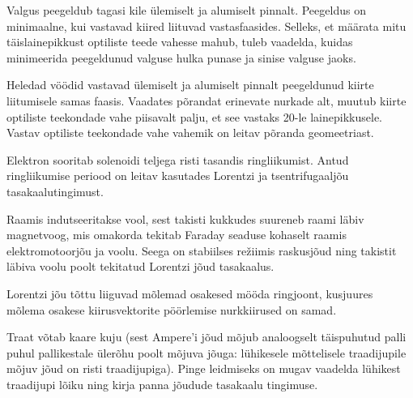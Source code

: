 \documentclass[10pt, twoside]{article}
\begin{document}
{%

\hint
Valgus peegeldub tagasi kile ülemiselt ja alumiselt pinnalt. Peegeldus on minimaalne, kui vastavad kiired liituvad vastasfaasides. Selleks, et määrata mitu täislainepikkust optiliste teede vahesse mahub, tuleb vaadelda, kuidas minimeerida peegeldunud valguse hulka punase ja sinise valguse jaoks.
\probend
\bigskip


\hint
Heledad vöödid vastavad ülemiselt ja alumiselt pinnalt peegeldunud kiirte liitumisele samas faasis. Vaadates põrandat erinevate nurkade alt, muutub kiirte optiliste teekondade vahe piisavalt palju, et see vastaks \num{20}-le lainepikkusele. Vastav optiliste teekondade vahe vahemik on leitav põranda geomeetriast.
\probend
\bigskip


\hint
Elektron sooritab solenoidi teljega risti tasandis ringliikumist. Antud ringliikumise periood on leitav kasutades Lorentzi ja tsentrifugaaljõu tasakaalutingimust.
\probend
\bigskip


\hint
Raamis indutseeritakse vool, sest takisti kukkudes suureneb raami läbiv magnetvoog, mis omakorda tekitab Faraday seaduse kohaselt raamis elektromotoorjõu ja voolu. Seega on stabiilses režiimis raskusjõud ning takistit läbiva voolu poolt tekitatud Lorentzi jõud tasakaalus.
\probend
\bigskip


\hint
Lorentzi jõu tõttu liiguvad mõlemad osakesed mööda ringjoont, kusjuures mõlema osakese kiirusvektorite pöörlemise nurkkiirused on samad.
\probend
\bigskip


\hint
Traat võtab kaare kuju (sest Ampere’i jõud mõjub analoogselt täispuhutud palli puhul pallikestale ülerõhu poolt mõjuva jõuga: lühikesele mõttelisele traadijupile mõjuv jõud on risti traadijupiga). Pinge leidmiseks on mugav vaadelda lühikest traadijupi lõiku ning kirja panna jõudude tasakaalu tingimuse.
\probend
\bigskip

}
\end{document}
